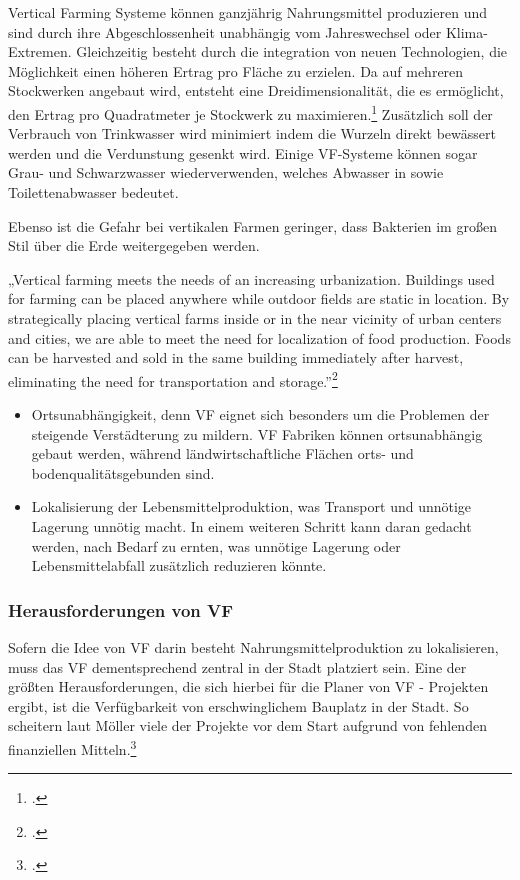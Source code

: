 \documentclass{scrartcl}
\begin{document}
Vertical Farming Systeme können ganzjährig Nahrungsmittel produzieren und sind durch ihre Abgeschlossenheit unabhängig vom Jahreswechsel oder Klima-Extremen. Gleichzeitig besteht durch die integration von neuen Technologien, die Möglichkeit einen höheren Ertrag pro Fläche zu erzielen. Da auf mehreren Stockwerken angebaut wird, entsteht eine Dreidimensionalität, die es ermöglicht, den Ertrag pro Quadratmeter je Stockwerk zu maximieren.\footcite{Despommier2010TheCentury.} Zusätzlich soll der Verbrauch von Trinkwasser wird minimiert indem die Wurzeln direkt bewässert werden und die Verdunstung gesenkt wird. Einige VF-Systeme können sogar Grau- und Schwarzwasser wiederverwenden, welches Abwasser in sowie Toilettenabwasser bedeutet. 

Ebenso ist die Gefahr bei vertikalen Farmen geringer, dass Bakterien im großen Stil über die Erde weitergegeben werden.

\begin{displayquote}
„Vertical farming meets the needs of an increasing urbanization. Buildings used for farming can be placed anywhere while outdoor fields are static in location. By strategically placing vertical farms inside or in the near vicinity of urban centers and cities, we are able to meet the need for localization of food production. Foods can be harvested and sold in the same building immediately after harvest, eliminating the need for transportation and storage.”\footcite[S.7]{PeterMollerVoss2013VerticalRise}
\end{displayquote}

\begin{itemize}
\item Ortsunabhängigkeit, denn VF eignet sich besonders um die Problemen der steigende Verstädterung zu mildern. VF Fabriken können ortsunabhängig gebaut werden, während  ländwirtschaftliche Flächen orts- und bodenqualitätsgebunden sind.
    \item Lokalisierung der Lebensmittelproduktion, was Transport und unnötige Lagerung unnötig macht. In einem weiteren Schritt kann daran gedacht werden, nach Bedarf zu ernten, was unnötige Lagerung oder Lebensmittelabfall zusätzlich reduzieren könnte.
\end{itemize}

\subsubsection{Herausforderungen von VF}

Sofern die Idee von VF darin besteht Nahrungsmittelproduktion zu lokalisieren, muss das VF dementsprechend zentral in der Stadt platziert sein. Eine der größten Herausforderungen, die sich hierbei für die Planer von VF - Projekten ergibt, ist die Verfügbarkeit von erschwinglichem Bauplatz in der Stadt. So scheitern laut Möller viele der Projekte vor dem Start aufgrund von fehlenden finanziellen Mitteln.\footcite[S.8]{PeterMollerVoss2013VerticalRise}
\end{document}
